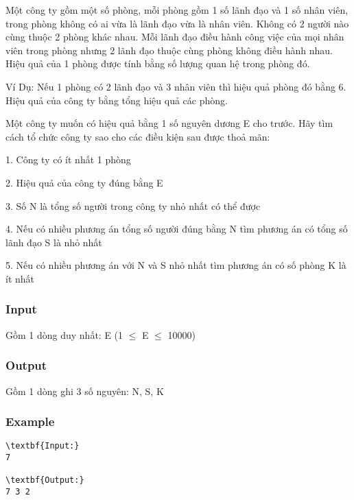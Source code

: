 



   Một công ty gồm một số phòng, mỗi phòng gồm 1 số lãnh đạo và 1 số nhân viên, trong phòng không có ai vừa là lãnh đạo vừa là nhân viên. Không có 2 người nào cùng thuộc 2 phòng khác nhau. Mỗi lãnh đạo điều hành công việc của mọi nhân viên trong phòng nhưng 2 lãnh đạo thuộc cùng phòng không điều hành nhau. Hiệu quả của 1 phòng được tính bằng số lượng quan hệ trong phòng đó.  

   Ví Dụ: Nếu 1 phòng có 2 lãnh đạo và 3 nhân viên thì hiệu quả phòng đó bằng 6. Hiệu quả của công ty bằng tổng hiệu quả các phòng.  

   Một công ty muốn có hiệu quả bằng 1 số nguyên dương E cho trước. Hãy tìm cách tổ chức công ty sao cho các điều kiện sau được thoả mãn:  

   1. Công ty có ít nhất 1 phòng  

   2. Hiệu quả của công ty đúng bằng E  

   3. Số N là tổng số người trong công ty nhỏ nhất có thể được  

   4. Nếu có nhiều phương án tổng số người đúng bằng N tìm phương án có tổng số lãnh đạo S là nhỏ nhất  

   5. Nếu có nhiều phương án với N và S nhỏ nhất tìm phương án có số phòng K là ít nhất  

\subsubsection{   Input  }

   Gồm 1 dòng duy nhất: E (1  $\le$  E  $\le$  10000)  

\subsubsection{   Output  }

   Gồm 1 dòng ghi 3 số nguyên: N, S, K  

\subsubsection{   Example  }
\begin{verbatim}
\textbf{Input:}
7

\textbf{Output:}
7 3 2
\end{verbatim}
